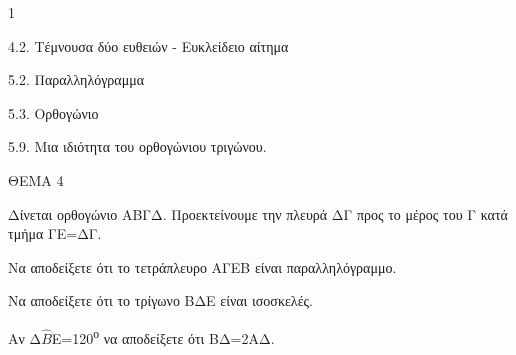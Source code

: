\begin{ylh}{1}
    \item 4.2. Τέμνουσα δύο ευθειών - Ευκλείδειο αίτημα
    \item 5.2. Παραλληλόγραμμα
    \item 5.3. Ορθογώνιο
    \item 5.9. Μια ιδιότητα του ορθογώνιου τριγώνου.
\end{ylh}

ΘΕΜΑ 4

Δίνεται ορθογώνιο ΑΒΓΔ. Προεκτείνουμε την πλευρά ΔΓ προς το μέρος του Γ κατά τμήμα ΓΕ=ΔΓ.

\begin{alist}
\item Να αποδείξετε ότι το τετράπλευρο ΑΓΕΒ είναι παραλληλόγραμμο. 

\item Να αποδείξετε ότι το τρίγωνο ΒΔΕ είναι ισοσκελές. 

\item Αν Δ$\widehat{Β}$Ε=120\textsuperscript{ο} να αποδείξετε ότι ΒΔ=2ΑΔ. 


\begin{center}
\end{center}
\end{alist}
